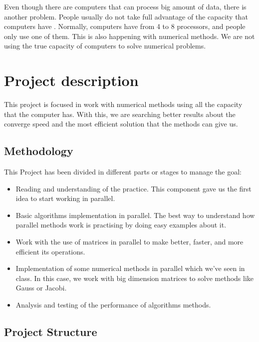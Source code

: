 \documentclass{article}
\begin{document}
Even though there are computers that
can process big amount of data, there is another problem. People usually do not take full advantage of the capacity that computers have . Normally, computers have from 4 to 8 processors, and people only use one of them. This is also happening
with numerical methods. We are not using the true capacity of computers to solve numerical problems.\\


\section{Project description}

This project is focused in work with numerical methods using all the capacity that the computer has. With this, we are searching better results about the
converge speed and the most efficient solution that the methods can give us.

\subsection{Methodology}


This Project has been divided in different parts or stages to manage the goal:

\begin{itemize}

\item Reading and understanding of the practice. This component gave us the first idea to start working in parallel.

\item Basic algorithms implementation in parallel. The best way to understand how parallel methods work is practising by doing easy examples about it.

\item Work with the use of matrices in parallel to make better, faster, and more efficient its operations.

\item Implementation of some numerical methods in parallel which we’ve seen in class. In this case, we work with big dimension matrices to solve methods like Gauss or Jacobi.

\item Analysis and testing of the performance of algorithms methods.

\end{itemize}

\subsection{Project Structure}
\end{document}
